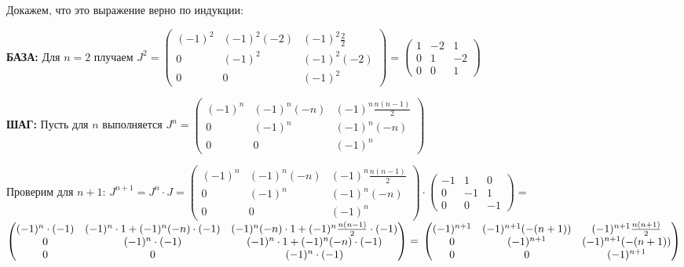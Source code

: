 \documentclass[a4paper, 12pt]{article}
\begin{document}
    \\\\ Докажем, что это выражение верно по индукции:
    \par \textbf{БАЗА: } Для $n = 2$ плучаем $J^2 = \begin{pmatrix}(-1)^{2} & (-1)^{2}(-2) & (-1)^2\frac{2}{2}\\0 & (-1)^{2} & (-1)^{2}(-2)\\0 & 0 & (-1)^{2}\end{pmatrix} = \begin{pmatrix}1 & -2 & 1\\0 & 1 & -2\\0 & 0 & 1\end{pmatrix}$
    \\
    \par \textbf{ШАГ: } Пусть для $n$ выполняется $J^n = \begin{pmatrix}(-1)^{n} & (-1)^{n}(-n) & (-1)^n\frac{n(n - 1)}{2}\\0 & (-1)^{n} & (-1)^{n}(-n)\\0 & 0 & (-1)^{n}\end{pmatrix}$
    \\
    \par Проверим для $n + 1$: $J^{n + 1} = J^n \cdot J = \begin{pmatrix}(-1)^{n} & (-1)^{n}(-n) & (-1)^n\frac{n(n - 1)}{2}\\0 & (-1)^{n} & (-1)^{n}(-n)\\0 & 0 & (-1)^{n}\end{pmatrix} \cdot \begin{pmatrix}-1 & 1 & 0 \\0 & -1 & 1 \\0 & 0 & -1 \end{pmatrix} 
    = $
    \\ $\begin{pmatrix}(-1)^n \cdot (-1) & (-1)^n \cdot 1 + (-1)^{n}(-n) \cdot (-1) & (-1)^{n}(-n)\cdot 1 + (-1)^n\frac{n(n - 1)}{2} \cdot (-1) \\0 & (-1)^n \cdot (-1) & (-1)^n \cdot 1 + (-1)^{n}(-n) \cdot (-1) \\0 & 0 & (-1)^n \cdot (-1) \end{pmatrix} = 
    \\ \begin{pmatrix}(-1)^{n + 1} & (-1)^{n + 1}(-(n + 1)) & (-1)^{n + 1}\frac{n(n + 1)}{2} \\0 & (-1)^{n + 1}  & (-1)^{n + 1}(-(n + 1))  \\0 & 0 & (-1)^{n + 1}  \end{pmatrix}$
\end{document}
